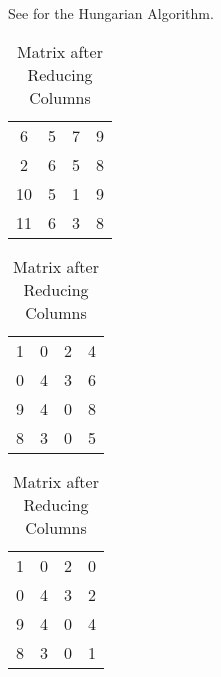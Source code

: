 \begin{subquestions}
\begin{subsubquestions}
See  for the Hungarian Algorithm.
\begin{table}[!hbt]
	\begin{minipage}{0.3\textwidth}
		\centering
		\begin{tabular}{cccc}
			6 & 5 & 7 & 9 \\
			2 & 6 & 5 & 8 \\
			10 & 5 & 1 & 9 \\
			11 & 6 & 3 & 8 \\
		\end{tabular}
		\captionsetup{width=1.1\linewidth}
		\caption*{Matrix From question}
	\end{minipage}
	\hspace{20pt}
	\begin{minipage}{0.3\textwidth}
		\centering
		\begin{tabular}{cccc}
			1 & 0 & 2 & 4 \\
			0 & 4 & 3 & 6 \\
			9 & 4 & 0 & 8 \\
			8 & 3 & 0 & 5 \\
		\end{tabular}
		\captionsetup{width=1.1\linewidth}
		\caption*{Matrix after Reducing Rows}
	\end{minipage}
	\hspace{20pt}
	\begin{minipage}{0.3\textwidth}
		\centering
		\begin{tabular}{cccc}
			1 & 0 & 2 & 0 \\
			0 & 4 & 3 & 2 \\
			9 & 4 & 0 & 4 \\
			8 & 3 & 0 & 1 \\
		\end{tabular}
		\captionsetup{width=1.1\linewidth}
		\caption*{Matrix after Reducing Columns} 
	\end{minipage}
	

\end{table}
\end{subsubquestions}
\end{subquestions}
